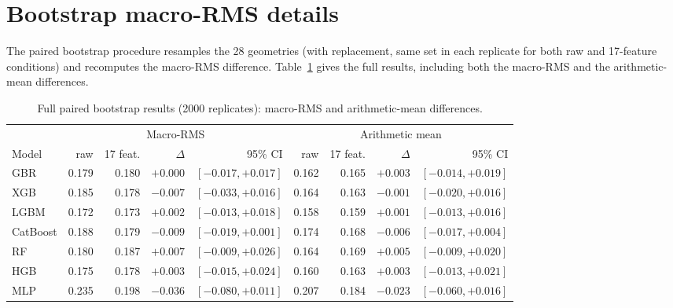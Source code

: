 \documentclass[12pt]{article}
\begin{document}
\section{Bootstrap macro-RMS details}
The paired bootstrap procedure resamples the 28 geometries (with replacement, same set in each replicate for both raw and 17-feature conditions) and recomputes the macro-RMS difference. Table~\ref{tab:bootstrap_app} gives the full results, including both the macro-RMS and the arithmetic-mean differences.

\begin{table}[!ht]\centering
\caption{Full paired bootstrap results (2000 replicates): macro-RMS and arithmetic-mean differences.}
\label{tab:bootstrap_app}\footnotesize\setlength{\tabcolsep}{3pt}
\begin{tabular}{lrrrrrrrr}
\toprule
& \multicolumn{4}{c}{Macro-RMS} & \multicolumn{4}{c}{Arithmetic mean} \\
\cmidrule(lr){2-5}\cmidrule(lr){6-9}
Model & raw & 17 feat. & $\Delta$ & 95\% CI & raw & 17 feat. & $\Delta$ & 95\% CI \\
\midrule
GBR      & 0.179 & 0.180 & $+0.000$ & $[-0.017, +0.017]$ & 0.162 & 0.165 & $+0.003$ & $[-0.014, +0.019]$ \\
XGB      & 0.185 & 0.178 & $-0.007$ & $[-0.033, +0.016]$ & 0.164 & 0.163 & $-0.001$ & $[-0.020, +0.016]$ \\
LGBM     & 0.172 & 0.173 & $+0.002$ & $[-0.013, +0.018]$ & 0.158 & 0.159 & $+0.001$ & $[-0.013, +0.016]$ \\
CatBoost & 0.188 & 0.179 & $-0.009$ & $[-0.019, +0.001]$ & 0.174 & 0.168 & $-0.006$ & $[-0.017, +0.004]$ \\
RF       & 0.180 & 0.187 & $+0.007$ & $[-0.009, +0.026]$ & 0.164 & 0.169 & $+0.005$ & $[-0.009, +0.020]$ \\
HGB      & 0.175 & 0.178 & $+0.003$ & $[-0.015, +0.024]$ & 0.160 & 0.163 & $+0.003$ & $[-0.013, +0.021]$ \\
MLP      & 0.235 & 0.198 & $-0.036$ & $[-0.080, +0.011]$ & 0.207 & 0.184 & $-0.023$ & $[-0.060, +0.016]$ \\
\bottomrule
\end{tabular}
\end{table}
\end{document}
